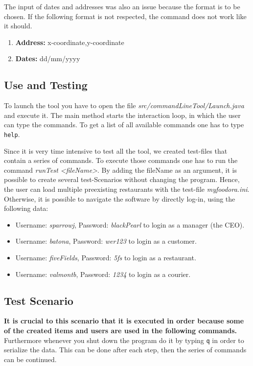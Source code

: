 The input of dates and addresses was also an issue because the format is to be chosen. If the 
following format is not respected, the command does not work like it should.
\begin{enumerate}
	\item \textbf{Address: } x-coordinate,y-coordinate
	\item \textbf{Dates: } dd/mm/yyyy
\end{enumerate}

\subsection{Use and Testing}
\label{sub:use_and_testing}

To launch the tool you have to open the file \textit{src/commandLineTool/Launch.java} and execute
it. The main method starts the interaction loop, in which the user can type the commands. To get
a list of all available commands one has to type \lstinline|help|. 

Since it is very time intensive to test all the tool, we created test-files that
contain a series of commands. To execute those commands one has to run the command 
\textit{runTest <fileName>}. By adding the fileName as an argument, it is possible to create 
several test-Scenarios without changing the program. Hence, the user can load multiple 
preexisting restaurants with the test-file \textit{my\textunderscore foodora.ini}.
Otherwise, it is possible to navigate the software by directly log-in, using the following data:
\begin{itemize}
	\item{}Username: \textit{sparrowj}, Password: \textit{blackPearl} to login as a manager (the CEO).
	\item{}Username: \textit{batona}, Password: \textit{wer123} to login as a customer.
	\item{}Username: \textit{fiveFields}, Password: \textit{5fs} to login as a restaurant.
	\item{}Username: \textit{valmontb}, Password: \textit{1234} to login as a courier.
\end{itemize}

\subsection{Test Scenario}
\label{sub:test_scenario}

\textbf{It is crucial to this scenario that it is executed in order because some of the created items and 
users are used in the following commands.} Furthermore whenever you shut down the program do it by
typing \lstinline|q| in order to serialize the data. This can be done after each step, then the 
series of commands can be continued.

